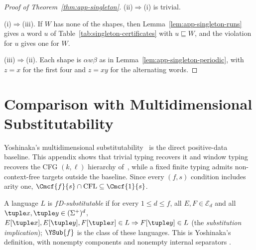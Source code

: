 \begin{proof}[Proof of Theorem~\ref{thm:app-singleton}]
(ii)$\Rightarrow$(i) is trivial.

(i)$\Rightarrow$(iii).  If $W$ has none of the shapes, then
Lemma~\ref{lem:app-singleton-runs} gives a word $u$ of
Table~\ref{tab:singleton-certificates} with $u\sqsubseteq W$, and the violation for
$u$ gives one for $W$.

(iii)$\Rightarrow$(ii).  Each shape is $\alpha w\beta$ as in
Lemma~\ref{lem:app-singleton-periodic}, with $z=x$ for the first four and $z=xy$
for the alternating words.
\end{proof}

\section{Comparison with Multidimensional Substitutability}
\label{sec:comparison}

Yoshinaka's multidimensional substitutability~\cite{Yoshinaka2009,Yoshinaka2011}
is the direct positive-data baseline.  This appendix shows that trivial typing
recovers it and window typing recovers the CFG $(k,\ell)$ hierarchy
of~\cite{Yoshinaka2008}, while a fixed finite typing admits non-context-free
targets outside the baseline.
Since every $(f,s)$ condition includes arity one,
$\Cmcf{f}{s}\cap\mathrm{CFL}\subseteq\Cmcf{1}{s}$.


\begin{definition}
\label{def:yoshinaka-pd-substitutability}
A language $L$ is \emph{$f$D-substitutable} if for every $1\le d\le f$, all
$E,F\in\mathcal E_d$ and all $\tuple x,\tuple y\in(\Sigma^+)^d$,
\(E[\tuple x],E[\tuple y],F[\tuple x]\in L\Rightarrow F[\tuple y]\in L\)
(the \emph{substitution implication}); $\YSub{f}$ is the class of these languages.
This is Yoshinaka's definition, with nonempty components and nonempty internal
separators \cite[Section~3.1 and footnote~3]{Yoshinaka2011}.
\end{definition}

